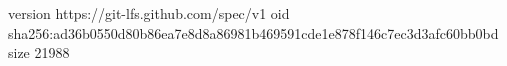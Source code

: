 version https://git-lfs.github.com/spec/v1
oid sha256:ad36b0550d80b86ea7e8d8a86981b469591cde1e878f146c7ec3d3afc60bb0bd
size 21988
